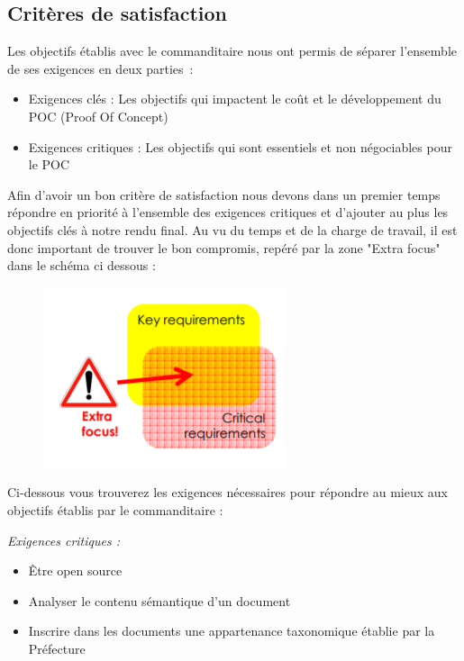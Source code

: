 \subsection {Critères de satisfaction}

 Les objectifs établis avec le commanditaire nous ont permis de séparer l'ensemble de ses exigences en deux parties :
\begin {itemize}
\item Exigences clés : Les objectifs qui impactent le coût et le développement du  POC (Proof Of Concept)
\item Exigences critiques : Les objectifs qui sont essentiels et non négociables pour le POC
\end {itemize}

\par
Afin d'avoir un bon critère de satisfaction nous devons dans un premier temps répondre en priorité à l'ensemble des exigences critiques et d'ajouter au plus les objectifs clés à notre rendu final.
\newpage
Au vu du temps et de la charge de travail, il est donc important de trouver le bon compromis, repéré par la zone "Extra focus" dans le schéma ci dessous : 

\begin{figure}[h!]
	\includegraphics{images/requirements.png}
	\label{fig:exigences}
\end{figure}		

	 Ci-dessous vous trouverez les exigences nécessaires pour répondre au mieux aux objectifs établis par le commanditaire :

\emph{Exigences critiques :}
\begin {itemize}
\item Être open source
\item Analyser le contenu sémantique d'un document
\item Inscrire dans les documents une appartenance taxonomique établie par la Préfecture
\\
\end {itemize}


